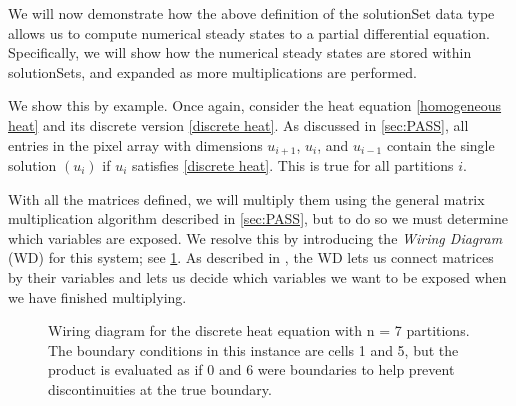 \documentclass[11pt]{article}
\begin{document}
We will now demonstrate how the above definition of the solutionSet data type allows us to compute numerical steady states to a partial differential equation. Specifically, we will show how the numerical steady states are stored within solutionSets, and expanded as more multiplications are performed. 

We show this by example. Once again, consider the heat equation \eqref{homogeneous heat} and its discrete version \eqref{discrete heat}. As discussed in \cref{sec:PASS}, all entries in the pixel array with dimensions $u_{i+1}$, $u_i$, and $u_{i-1}$ contain the single solution ${(u_i)}$ if $u_i$ satisfies \cref{discrete heat}. This is true for all partitions $i$.

With all the matrices defined, we will multiply them using the general matrix multiplication algorithm described in \cref{sec:PASS}, but to do so we must determine which variables are exposed. We resolve this by introducing the \textit{Wiring Diagram} (WD) for this system; see \cref{WD_heat}. As described in \citep{Introduction_to_PA}, the WD lets us connect matrices by their variables and lets us decide which variables we want to be exposed when we have finished multiplying.

\begin{figure}
\caption{Wiring diagram for the discrete heat equation with n = 7 partitions. The boundary conditions in this instance are cells 1 and 5, but the product is evaluated as if 0 and 6 were boundaries to help prevent discontinuities at the true boundary.}
\label{WD_heat}
\begin{center}
\end{center}
\end{figure}
\end{document}
